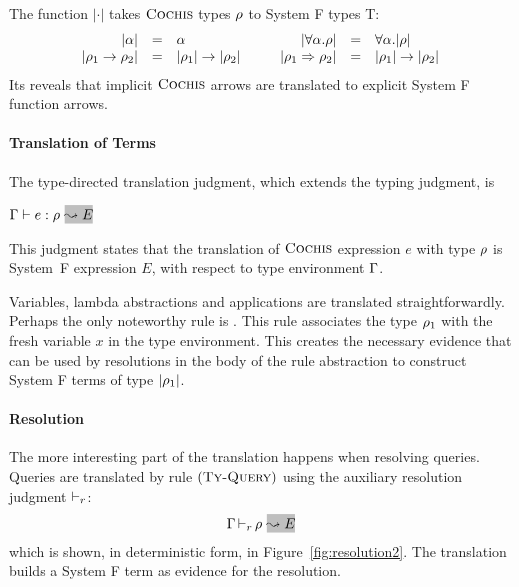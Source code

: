 The function $|\cdot|$ takes 
$\textsc{Cochis}$ types $\rho$ to System F types T: 
\begin{equation*}
\begin{array}{rcl@{\hspace{1cm}}rcl}
|\alpha| & = & \alpha &
|\forall \alpha. \rulet| & = & \forall \alpha. |\rulet| \\
|\rulet_1 \arrow \rulet_2| & = & |\rulet_1| \arrow |\rulet_2| &
|\rulet_1 \iarrow \rulet_2| & = & |\rulet_1| \arrow |\rulet_2| %
\end{array}
\end{equation*}
Its reveals that implicit $\textsc{Cochis}$ arrows are translated to explicit System F function arrows.

\paragraph{Translation of Terms}

The type-directed translation judgment, which extends the typing judgment, is 
\begin{center}
  $\tenv \turns \relation{e}{\rulet}~\gbox{\leadsto E}$
\end{center}
This judgment states that the translation of $\textsc{Cochis}$ expression $e$ with
type $\rho$ is System~F expression $E$, with respect to type environment
$\Gamma$.

Variables, lambda abstractions and applications
are translated straightforwardly. Perhaps the only noteworthy 
rule is \TyIAbs. This rule associates the type $\rho_1$ with 
the fresh variable $x$ in the type environment. 
This creates the necessary evidence that can be used by resolutions 
in the body of the rule abstraction to construct System F terms of type $|\rho_1|$. 

\paragraph{Resolution}
The more interesting part of the translation happens when resolving queries.
Queries are translated by rule $\mbox{({\tt\sc Ty-Query})}$ using the auxiliary resolution
judgment $\mathop{\vdash_{r}}$:
\begin{equation*}
\tenv \ivturns \rulet~\gbox{\leadsto E}
\end{equation*}
which is shown, in deterministic form, in Figure~\ref{fig:resolution2}.  The
translation builds a System F term as evidence for the resolution.  

